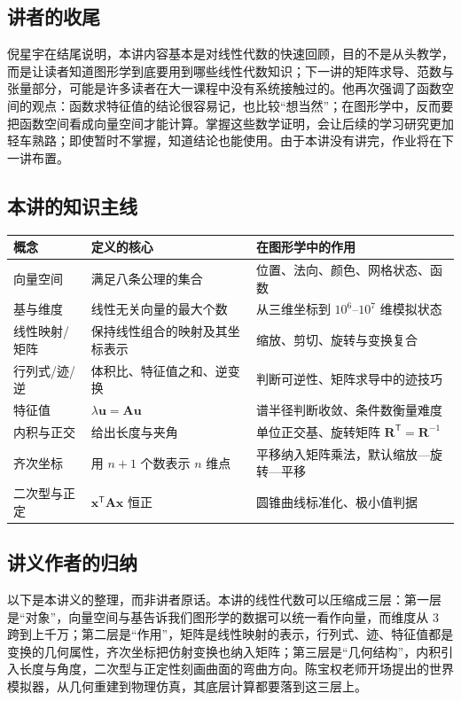 \documentclass[a4paper]{article}
\begin{document}
\subsection{讲者的收尾}

倪星宇在结尾说明，本讲内容基本是对线性代数的快速回顾，目的不是从头教学，而是让读者知道图形学到底要用到哪些线性代数知识；下一讲的矩阵求导、范数与张量部分，可能是许多读者在大一课程中没有系统接触过的。他再次强调了函数空间的观点：函数求特征值的结论很容易记，也比较“想当然”；在图形学中，反而要把函数空间看成向量空间才能计算。掌握这些数学证明，会让后续的学习研究更加轻车熟路；即使暂时不掌握，知道结论也能使用。由于本讲没有讲完，作业将在下一讲布置。

\subsection{本讲的知识主线}

\begin{center}
\begin{tabular}{p{}p{}p{}}
\toprule
概念 & 定义的核心 & 在图形学中的作用 \\
\midrule
向量空间 & 满足八条公理的集合 & 位置、法向、颜色、网格状态、函数 \\
基与维度 & 线性无关向量的最大个数 & 从三维坐标到 $10^6$--$10^7$ 维模拟状态 \\
线性映射/矩阵 & 保持线性组合的映射及其坐标表示 & 缩放、剪切、旋转与变换复合 \\
行列式/迹/逆 & 体积比、特征值之和、逆变换 & 判断可逆性、矩阵求导中的迹技巧 \\
特征值 & $\lambda\boldsymbol u=\boldsymbol A\boldsymbol u$ & 谱半径判断收敛、条件数衡量难度 \\
内积与正交 & 给出长度与夹角 & 单位正交基、旋转矩阵 $\boldsymbol R^{\mathsf T}=\boldsymbol R^{-1}$ \\
齐次坐标 & 用 $n+1$ 个数表示 $n$ 维点 & 平移纳入矩阵乘法，默认缩放—旋转—平移 \\
二次型与正定 & $\boldsymbol x^{\mathsf T}\boldsymbol A\boldsymbol x$ 恒正 & 圆锥曲线标准化、极小值判据 \\
\bottomrule
\end{tabular}
\end{center}

\subsection{讲义作者的归纳}

以下是本讲义的整理，而非讲者原话。本讲的线性代数可以压缩成三层：第一层是“对象”，向量空间与基告诉我们图形学的数据可以统一看作向量，而维度从 3 跨到上千万；第二层是“作用”，矩阵是线性映射的表示，行列式、迹、特征值都是变换的几何属性，齐次坐标把仿射变换也纳入矩阵；第三层是“几何结构”，内积引入长度与角度，二次型与正定性刻画曲面的弯曲方向。陈宝权老师开场提出的世界模拟器，从几何重建到物理仿真，其底层计算都要落到这三层上。
\end{document}

